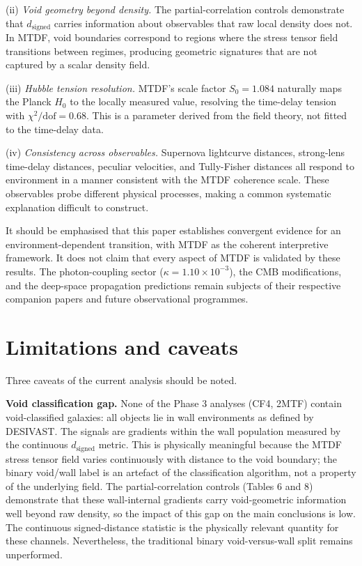 \documentclass[11pt,a4paper]{article}
\begin{document}
(ii) \emph{Void geometry beyond density.} The partial-correlation controls demonstrate that \(d_\mathrm{signed}\) carries information about observables that raw local density does not. In MTDF, void boundaries correspond to regions where the stress tensor field transitions between regimes, producing geometric signatures that are not captured by a scalar density field.

(iii) \emph{Hubble tension resolution.} MTDF's scale factor \(S_0 = 1.084\) naturally maps the Planck \(H_0\) to the locally measured value, resolving the time-delay tension with \(\chi^2/\mathrm{dof} = 0.68\). This is a parameter derived from the field theory, not fitted to the time-delay data.

(iv) \emph{Consistency across observables.} Supernova lightcurve distances, strong-lens time-delay distances, peculiar velocities, and Tully-Fisher distances all respond to environment in a manner consistent with the MTDF coherence scale. These observables probe different physical processes, making a common systematic explanation difficult to construct.

It should be emphasised that this paper establishes convergent evidence for an environment-dependent transition, with MTDF as the coherent interpretive framework. It does not claim that every aspect of MTDF is validated by these results. The photon-coupling sector (\(\kappa = 1.10 \times 10^{-3}\)), the CMB modifications, and the deep-space propagation predictions remain subjects of their respective companion papers and future observational programmes.

\section{Limitations and caveats}
\label{sec:sec9}
Three caveats of the current analysis should be noted.

\textbf{Void classification gap.} None of the Phase 3 analyses (CF4, 2MTF) contain void-classified galaxies: all objects lie in wall environments as defined by DESIVAST. The signals are gradients within the wall population measured by the continuous \(d_\mathrm{signed}\) metric. This is physically meaningful because the MTDF stress tensor field varies continuously with distance to the void boundary; the binary void/\allowbreak{}wall label is an artefact of the classification algorithm, not a property of the underlying field. The partial-correlation controls (Tables 6 and 8) demonstrate that these wall-internal gradients carry void-geometric information well beyond raw density, so the impact of this gap on the main conclusions is low. The continuous signed-distance statistic is the physically relevant quantity for these channels. Nevertheless, the traditional binary void-versus-wall split remains unperformed.
\end{document}
